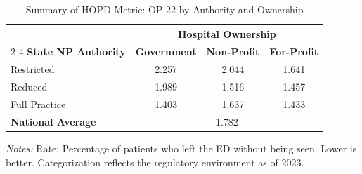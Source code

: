 \begin{table}[htbp]
    \centering
    \caption{Summary of HOPD Metric: OP-22 by Authority and Ownership}
    \label{tab:hopd_op_22_own}
    \vspace{0.2cm}
    \begin{tabular}{lccc}
        \toprule
        & \multicolumn{3}{c}{\textbf{Hospital Ownership}} \\
        \cmidrule(lr){2-4}
        \textbf{State NP Authority} & \textbf{Government} & \textbf{Non-Profit} & \textbf{For-Profit} \\
        \midrule
        Restricted & 2.257 & 2.044 & 1.641 \\
        Reduced & 1.989 & 1.516 & 1.457 \\
        Full Practice & 1.403 & 1.637 & 1.433 \\
        \midrule
        \textbf{National Average} & \multicolumn{3}{c}{1.782} \\
        \bottomrule
    \end{tabular}
    \vspace{0.1cm}
    \begin{minipage}{0.85\textwidth}
        \footnotesize \textit{Notes:} Rate: Percentage of patients who left the ED without being seen. Lower is better. Categorization reflects the regulatory environment as of 2023.
    \end{minipage}
\end{table}
